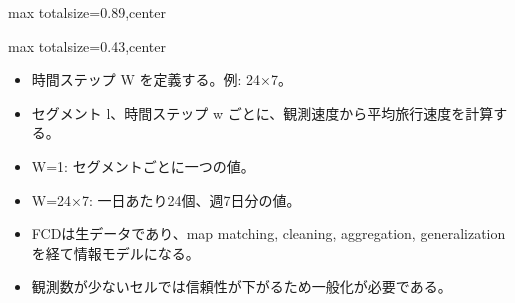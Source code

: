 \begin{minipage}[t]{0.58\textwidth}
\begin{adjustbox}{max totalsize={\textwidth}{0.89\textheight},center}
\begin{minipage}{\textwidth}
\end{minipage}
\end{adjustbox}
\end{minipage}


\clearpage
{}
\begin{minipage}[t]{0.405\textwidth}
\begin{adjustbox}{max totalsize={\textwidth}{0.43\textheight},center}
\begin{minipage}{\textwidth}\scriptsize
{}\begin{itemize}
\item 時間ステップ W を定義する。例: 24×7。
\item セグメント l、時間ステップ w ごとに、観測速度から平均旅行速度を計算する。
\item W=1: セグメントごとに一つの値。
\item W=24×7: 一日あたり24個、週7日分の値。
\end{itemize}\begin{itemize}
\item FCDは生データであり、map matching, cleaning, aggregation, generalization を経て情報モデルになる。
\item 観測数が少ないセルでは信頼性が下がるため一般化が必要である。
\end{itemize}
\end{minipage}
\end{adjustbox}
\end{minipage}\hfill
